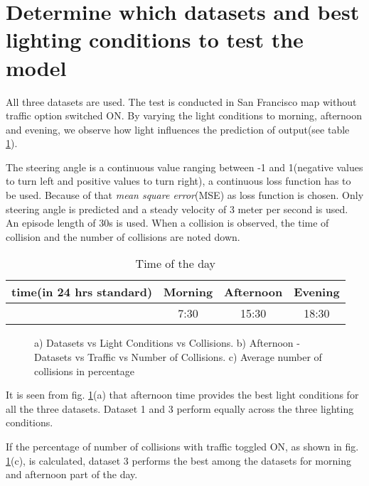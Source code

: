 \section{Determine which datasets and best lighting conditions to test the model}
\label{chapter05subsec:setup1}
All three datasets are used. The test is conducted in San Francisco map without traffic
option switched ON. By varying the light conditions to morning, afternoon and evening, we
observe how light influences the prediction of output(see table \ref{table:timeoftheday}).

The steering angle is a continuous value ranging between -1 and 1(negative values to
turn left and positive values to turn right), a continuous loss function has to be used.
Because of that \textit{mean square error}(MSE) as loss function is chosen.
Only steering angle is predicted
and a steady velocity of 3 meter per second is used. An episode length of 30s is used.
When a collision is observed, the time of collision and the number of collisions are noted down.
\begin{table}[!ht]
    \centering
\begin{tabular}{cccc}
    \toprule
    time(in 24 hrs standard) & Morning & Afternoon & Evening \\\midrule
      & 7:30 & 15:30 & 18:30 \\\bottomrule
\end{tabular}
\caption{Time of the day}
\label{table:timeoftheday}
\end{table}

\begin{figure}[h]
	\centering
    \def\svgwidth{0.9\textwidth}
    \caption{a) Datasets vs Light Conditions vs Collisions.
        b) Afternoon - Datasets vs Traffic vs Number of Collisions.
    c) Average number of collisions in percentage}
    \label{fig:dsvslcvstrafficAll}
\end{figure}

It is seen from fig. \ref{fig:dsvslcvstrafficAll}(a) that afternoon time provides the best light conditions for all the three
datasets. Dataset 1 and 3 perform equally across the three lighting conditions.

If the percentage of number of collisions with traffic toggled ON, as shown in fig. \ref{fig:dsvslcvstrafficAll}(c), is calculated, dataset 3 performs the best among
the datasets for morning and afternoon part of the day.

